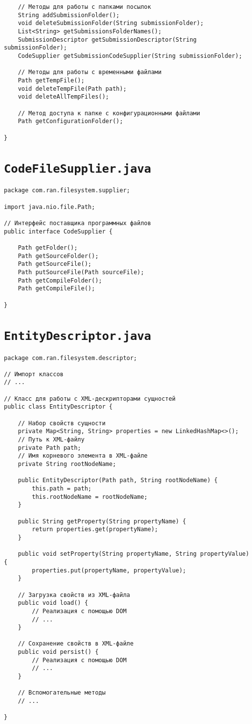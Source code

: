 \begin{verbatim}
    // Методы для работы с папками посылок
    String addSubmissionFolder();
    void deleteSubmissionFolder(String submissionFolder);
    List<String> getSubmissionsFolderNames();
    SubmissionDescriptor getSubmissionDescriptor(String submissionFolder);
    CodeSupplier getSubmissionCodeSupplier(String submissionFolder);

    // Методы для работы с временными файлами
    Path getTempFile();
    void deleteTempFile(Path path);
    void deleteAllTempFiles();

    // Метод доступа к папке с конфигурационными файлами
    Path getConfigurationFolder();
    
}
\end{verbatim}

\section*{\texttt{CodeFileSupplier.java}}
\begin{verbatim}
package com.ran.filesystem.supplier;

import java.nio.file.Path;

// Интерфейс поставщика программных файлов
public interface CodeSupplier {

    Path getFolder();
    Path getSourceFolder();
    Path getSourceFile();
    Path putSourceFile(Path sourceFile);
    Path getCompileFolder();
    Path getCompileFile();

}
\end{verbatim}

\section*{\texttt{EntityDescriptor.java}}
\begin{verbatim}
package com.ran.filesystem.descriptor;

// Импорт классов
// ...

// Класс для работы с XML-дескрипторами сущностей
public class EntityDescriptor {

    // Набор свойств сущности
    private Map<String, String> properties = new LinkedHashMap<>();
    // Путь к XML-файлу
    private Path path;
    // Имя корневого элемента в XML-файле
    private String rootNodeName;

    public EntityDescriptor(Path path, String rootNodeName) {
        this.path = path;
        this.rootNodeName = rootNodeName;
    }
    
    public String getProperty(String propertyName) {
        return properties.get(propertyName);
    }
    
    public void setProperty(String propertyName, String propertyValue) {
        properties.put(propertyName, propertyValue);
    }
    
    // Загрузка свойств из XML-файла
    public void load() {
        // Реализация с помощью DOM
        // ...
    }
    
    // Сохранение свойств в XML-файле
    public void persist() {
        // Реализация с помощью DOM
        // ...
    }
    
    // Вспомогательные методы
    // ...
    
}
\end{verbatim}